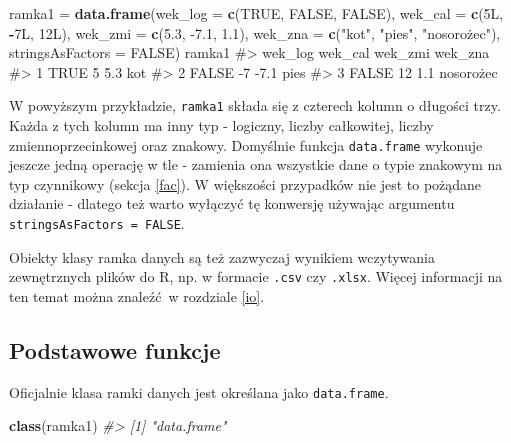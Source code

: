 \documentclass[paper=6in:9in,pagesize=pdftex,headinclude=on,footinclude=on,10pt]{scrbook}
\newenvironment{Shaded}{\begin{snugshade}}{\end{snugshade}}
\newcommand{\CommentTok}[1]{\textcolor[rgb]{0.56,0.35,0.01}{\textit{#1}}}
\newcommand{\DataTypeTok}[1]{\textcolor[rgb]{0.13,0.29,0.53}{#1}}
\newcommand{\FloatTok}[1]{\textcolor[rgb]{0.00,0.00,0.81}{#1}}
\newcommand{\KeywordTok}[1]{\textcolor[rgb]{0.13,0.29,0.53}{\textbf{#1}}}
\newcommand{\NormalTok}[1]{#1}
\newcommand{\OperatorTok}[1]{\textcolor[rgb]{0.81,0.36,0.00}{\textbf{#1}}}
\newcommand{\OtherTok}[1]{\textcolor[rgb]{0.56,0.35,0.01}{#1}}
\newcommand{\StringTok}[1]{\textcolor[rgb]{0.31,0.60,0.02}{#1}}
\let\BeginKnitrBlock\begin \let\EndKnitrBlock\end
\begin{document}
\begin{Shaded}
\begin{Highlighting}[]
\NormalTok{ramka1 =}\StringTok{ }\KeywordTok{data.frame}\NormalTok{(}\DataTypeTok{wek_log =} \KeywordTok{c}\NormalTok{(}\OtherTok{TRUE}\NormalTok{, }\OtherTok{FALSE}\NormalTok{, }\OtherTok{FALSE}\NormalTok{),}
                    \DataTypeTok{wek_cal =} \KeywordTok{c}\NormalTok{(5L, }\OperatorTok{-}\NormalTok{7L, 12L), }
                    \DataTypeTok{wek_zmi =} \KeywordTok{c}\NormalTok{(}\FloatTok{5.3}\NormalTok{, }\FloatTok{-7.1}\NormalTok{, }\FloatTok{1.1}\NormalTok{), }
                    \DataTypeTok{wek_zna =} \KeywordTok{c}\NormalTok{(}\StringTok{"kot"}\NormalTok{, }\StringTok{"pies"}\NormalTok{, }\StringTok{"nosorożec"),}
\StringTok{                    stringsAsFactors = FALSE)}
\StringTok{ramka1}
\StringTok{#>   wek_log wek_cal wek_zmi   wek_zna}
\StringTok{#> 1    TRUE       5     5.3       kot}
\StringTok{#> 2   FALSE      -7    -7.1      pies}
\StringTok{#> 3   FALSE      12     1.1 nosorożec}
\end{Highlighting}
\end{Shaded}

W powyższym przykładzie, \texttt{ramka1} składa się z czterech kolumn o długości trzy.
Każda z tych kolumn ma inny typ - logiczny, liczby całkowitej, liczby zmiennoprzecinkowej oraz znakowy.
Domyślnie funkcja \texttt{data.frame} wykonuje jeszcze jedną operację w tle - zamienia ona wszystkie dane o typie znakowym na typ czynnikowy (sekcja \ref{fac}).
W większości przypadków nie jest to pożądane działanie - dlatego też warto wyłączyć tę konwersję używając argumentu \texttt{stringsAsFactors\ =\ FALSE}.

\BeginKnitrBlock{rmdinfo}
Obiekty klasy ramka danych są też zazwyczaj wynikiem wczytywania zewnętrznych plików do R, np. w formacie \texttt{.csv} czy \texttt{.xlsx}.
Więcej informacji na ten temat można znaleźć~w rozdziale \ref{io}.
\EndKnitrBlock{rmdinfo}

\hypertarget{podstawowe-funkcje-1}{%
\subsection{Podstawowe funkcje}\label{podstawowe-funkcje-1}}

Oficjalnie klasa ramki danych jest określana jako \texttt{data.frame}.

\begin{Shaded}
\begin{Highlighting}[]
\KeywordTok{class}\NormalTok{(ramka1)}
\CommentTok{#> [1] "data.frame"}
\end{Highlighting}
\end{Shaded}
\end{document}
